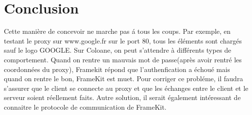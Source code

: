 \documentclass{article}
\begin{document}
\section{Conclusion}
	Cette mani\`ere de concevoir ne marche pas \'a tous les coups. Par exemple, en testant le proxy sur www.google.fr sur le port 80, tous les \'el\'ements sont charg\'es sauf le logo GOOGLE. Sur Coloane, on peut s'attendre à diff\'erents types de comportement. Quand on rentre un mauvais mot de passe(apr\`es avoir rentr\'e les coordonn\'ees du proxy), Framekit r\'epond que l'authenfication a \'echou\'e mais quand on rentre le bon, FrameKit est muet.
Pour corriger ce probl\'eme, il faudra s'assurer que le client se connecte au proxy et que les \'echanges entre le client et le serveur soient r\'eellement faits. Autre solution, il serait \'egalement int\'eressant de connaitre le protocole de communication de FrameKit.
\end{document}
